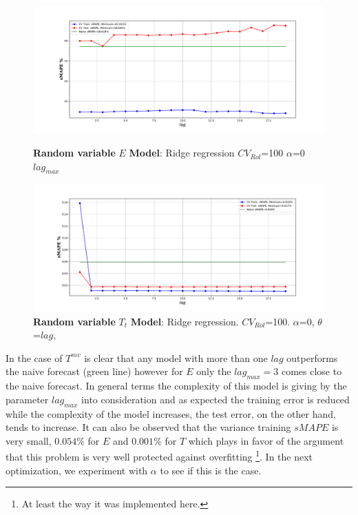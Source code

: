 \begin{figure}[h!]
	\centering
	
	\begin{minipage}[b]{\textwidth}
		\includegraphics[width=\textwidth]{notebooks/data/error_sc_1_lag.pdf}
		\caption{\textbf{Random variable} $E$ \textbf{Model}: Ridge regression \textbf{$CV_{Rol}$}=100 \textbf{$\alpha$}=0 $lag_{max}$ }
		\label{fig:error_sc_1_lag}
	\end{minipage}
	
	\hfill
	\begin{minipage}[b]{\textwidth}
		\includegraphics[width=\textwidth]{notebooks/data/trend_sc_1_lag.pdf}
		\caption{\textbf{Random variable} $T_{t}$ \textbf{Model}: Ridge regression. \textbf{$CV_{Rol}$}=100. $\alpha$=0, $\theta$=$lag$, } %
		\label{fig:trend_sc_1_lag}
	\end{minipage}
	
\end{figure}


In the case of $T^{mv}$ is clear that any model with more than one $lag$ outperforms the naive forecast (green line) however for $E$ only the $lag_{max}=3$ comes close to the naive forecast. In general terms the complexity of this model is giving by the parameter $lag_{max}$ into consideration and as expected the training error is reduced while the complexity of the model increases, the test error, on the other hand, tends to increase. It can also be observed that the variance training $sMAPE$ is very small, $0.054\%$ for $E$ and $0.001\%$ for $T$ which plays in favor of the argument that this problem is very well protected against overfitting \footnote{At least the way it was implemented here.}. In the next optimization, we experiment with $\alpha$ to see if this is the case. \\

